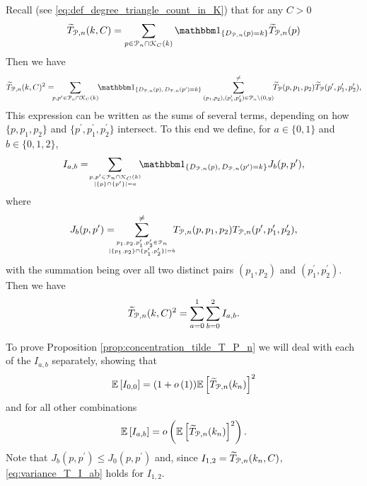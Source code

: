 Recall (see \eqref{eq:def_degree_triangle_count_in_K}) that for any $C > 0$
\[
	\widetilde{T}_{\Pcal,n}(k,C) = \sum_{p \in \Pcal_n \cap \Kcal_{C}(k)} \ind{D_{\Pcal,n}(p) = k}
	\widetilde{T}_{\Pcal,n}(p)
\]
Then we have
\[
	\widetilde{T}_{\Pcal,n}(k,C)^2 = \hspace{-5pt} \sum_{p, p^\prime \in \Pcal_n \cap \Kcal_C(k)}
		\hspace{-3pt} \ind{D_{\Pcal,n}(p), \, D_{\Pcal,n}(p^\prime) = k} 
		\sum_{(p_1, p_2), (p_1^\prime, p_2^\prime) \in \Pcal_n \setminus (0,y)}^{\ne} \hspace{-3pt}
		\widetilde{T}_{\Pcal}(p,p_1,p_2) \widetilde{T}_{\Pcal}(p^\prime, p_1^\prime, p_2^\prime),
\]
This expression can be written as the sums of several terms, depending on how $\{p, p_1, p_2\}$ and $\{p^\prime, p_1^\prime, p_2^\prime\}$ intersect. To this end we define, for $a \in \{0,1\}$ and $b \in \{0,1,2\}$,
\[
	I_{a,b} = \hspace{-3pt} \sum_{p, p^\prime \in \Pcal_n \cap \Kcal_C(k) \atop |\{p\} \cap \{p^\prime\}| = a}
	\hspace{-5pt} \ind{D_{\Pcal,n}(p), \, D_{\Pcal,n}(p^\prime) = k} J_b(p,p^\prime),
\]
where
\[
	J_b(p,p^\prime) = \hspace{-10pt} \sum_{p_1, p_2, p_1^\prime, p_2^\prime \in \Pcal_n 
		\atop |\{p_1, p_2\} \cap \{p_1^\prime, p_2^\prime\}| = b}^{\ne}
		\hspace{-5pt} T_{\Pcal,n}(p,p_1,p_2) T_{\Pcal,n}(p^\prime, p_1^\prime, p_2^\prime),
\]
with the summation being over all two distinct pairs $(p_1, p_2)$ and $(p_1^\prime, p_2^\prime)$. Then we have
\[
	\widetilde{T}_{{\mathcal P},n}(k, C)^2 = \sum_{a = 0}^1 \sum_{b = 0}^2 I_{a,b}.
\]

To prove Proposition \ref{prop:concentration_tilde_T_P_n} we will deal with each of the $I_{a,b}$ separately, showing that 
\begin{equation}\label{eq:variance_T_I_00}
	\mathbb{E}\left[I_{0,0}\right] = (1+o\left(1\right))\mathbb{E}\left[\widetilde{T}_{{\mathcal P},n}(k_n)\right]^2
\end{equation}
and for all other combinations
\begin{equation}\label{eq:variance_T_I_ab}
	\mathbb{E}\left[I_{a,b}\right] = o\left(\mathbb{E}\left[\widetilde{T}_{{\mathcal P},n}(k_n)\right]^2\right).
\end{equation}
Note that $J_{b}(p,p^\prime) \le J_{0}(p,p^\prime)$ and, since $I_{1,2} = \widetilde{T}_{{\mathcal P},n}(k_n,C)$, \eqref{eq:variance_T_I_ab} holds for $I_{1,2}$. 

